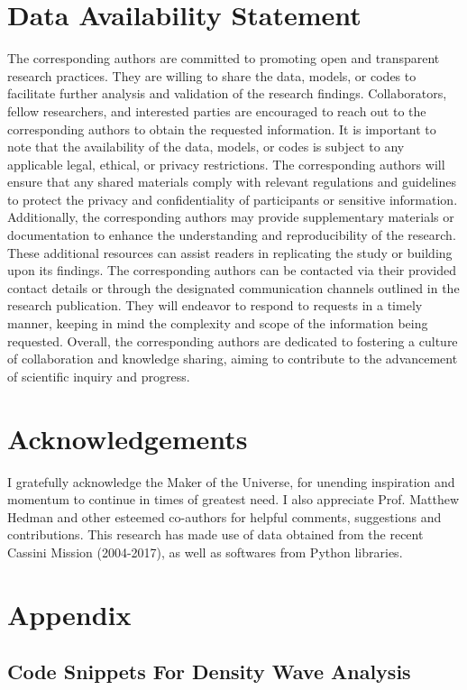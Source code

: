 \documentclass{article}
\begin{document}
\section{Data Availability Statement}
The corresponding authors are committed to promoting open and transparent research practices. They are willing to share the data, models, or codes to facilitate further analysis and validation of the research findings. Collaborators, fellow researchers, and interested parties are encouraged to reach out to the corresponding authors to obtain the requested information. It is important to note that the availability of the data, models, or codes is subject to any applicable legal, ethical, or privacy restrictions. The corresponding authors will ensure that any shared materials comply with relevant regulations and guidelines to protect the privacy and confidentiality of participants or sensitive information. Additionally, the corresponding authors may provide supplementary materials or documentation to enhance the understanding and reproducibility of the research. These additional resources can assist readers in replicating the study or building upon its findings. The corresponding authors can be contacted via their provided contact details or through the designated communication channels outlined in the research publication. They will endeavor to respond to requests in a timely manner, keeping in mind the complexity and scope of the information being requested. Overall, the corresponding authors are dedicated to fostering a culture of collaboration and knowledge sharing, aiming to contribute to the advancement of scientific inquiry and progress.

\section{Acknowledgements}
I gratefully acknowledge the Maker of the Universe, for unending inspiration and momentum to continue in times of greatest need. I also appreciate Prof. Matthew Hedman and other esteemed co-authors for helpful comments, suggestions and contributions. This research has made use of data obtained from the recent Cassini Mission (2004-2017), as well as softwares from Python libraries. 


\section{Appendix}
\label{sec:appendix}


\subsection{Code Snippets For Density Wave Analysis}
\label{subsec:code}
\end{document}
